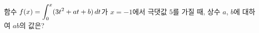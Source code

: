 함수 $f(x)=\displaystyle\int_{0}^{x} (3t^2+at+b)\mkern3mu dt$가 $x=-1$에서 극댓값 $5$를 가질 때, 상수 $a$, $b$에 대하여 $ab$의 값은?
